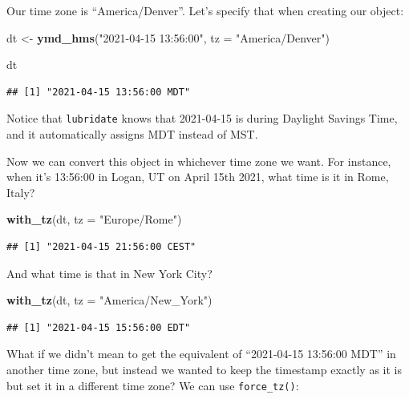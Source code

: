 \documentclass[
]{book}
\newenvironment{Shaded}{\begin{snugshade}}{\end{snugshade}}
\newcommand{\AttributeTok}[1]{\textcolor[rgb]{0.13,0.29,0.53}{#1}}
\newcommand{\FunctionTok}[1]{\textcolor[rgb]{0.13,0.29,0.53}{\textbf{#1}}}
\newcommand{\NormalTok}[1]{#1}
\newcommand{\OtherTok}[1]{\textcolor[rgb]{0.56,0.35,0.01}{#1}}
\newcommand{\StringTok}[1]{\textcolor[rgb]{0.31,0.60,0.02}{#1}}
\begin{document}
Our time zone is ``America/Denver''. Let's specify that when creating our object:

\begin{Shaded}
\begin{Highlighting}[]
\NormalTok{dt }\OtherTok{\textless{}{-}} \FunctionTok{ymd\_hms}\NormalTok{(}\StringTok{"2021{-}04{-}15 13:56:00"}\NormalTok{, }\AttributeTok{tz =} \StringTok{"America/Denver"}\NormalTok{)}

\NormalTok{dt}
\end{Highlighting}
\end{Shaded}

\begin{verbatim}
## [1] "2021-04-15 13:56:00 MDT"
\end{verbatim}

Notice that \texttt{lubridate} knows that 2021-04-15 is during Daylight Savings Time, and it automatically assigns MDT instead of MST.

Now we can convert this object in whichever time zone we want. For instance, when it's 13:56:00 in Logan, UT on April 15th 2021, what time is it in Rome, Italy?

\begin{Shaded}
\begin{Highlighting}[]
\FunctionTok{with\_tz}\NormalTok{(dt, }\AttributeTok{tz =} \StringTok{"Europe/Rome"}\NormalTok{)}
\end{Highlighting}
\end{Shaded}

\begin{verbatim}
## [1] "2021-04-15 21:56:00 CEST"
\end{verbatim}

And what time is that in New York City?

\begin{Shaded}
\begin{Highlighting}[]
\FunctionTok{with\_tz}\NormalTok{(dt, }\AttributeTok{tz =} \StringTok{"America/New\_York"}\NormalTok{)}
\end{Highlighting}
\end{Shaded}

\begin{verbatim}
## [1] "2021-04-15 15:56:00 EDT"
\end{verbatim}

What if we didn't mean to get the equivalent of ``2021-04-15 13:56:00 MDT'' in another time zone, but instead we wanted to keep the timestamp exactly as it is but set it in a different time zone? We can use \texttt{force\_tz()}:
\end{document}
